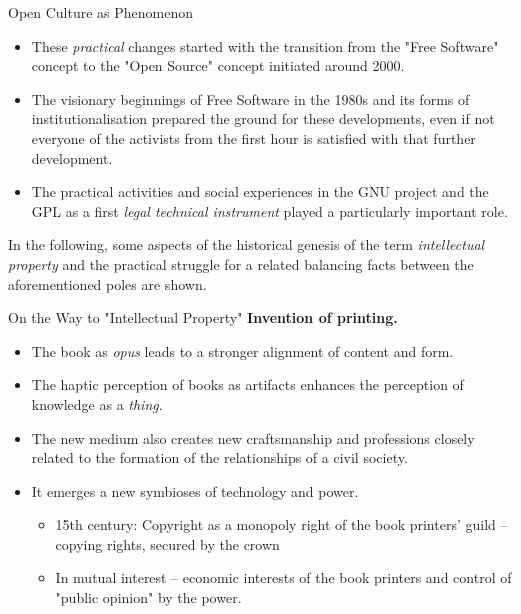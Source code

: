 \documentclass{beamer}
\begin{document}
\begin{frame}{Open Culture as Phenomenon} 
\begin{itemize} 
\item These \emph{practical} changes started with the transition from the
  "Free Software" concept to the "Open Source" concept initiated around 2000.
\item The visionary beginnings of Free Software in the 1980s and its forms of
  institutionalisation prepared the ground for these developments, even if not
  everyone of the activists from the first hour is satisfied with that further
  development.
\item The practical activities and social experiences in the GNU project and
  the GPL as a first \emph{legal technical instrument} played a particularly
  important role.
\end{itemize}
In the following, some aspects of the historical genesis of the term
\emph{intellectual property} and the practical struggle for a related
balancing facts between the aforementioned poles are shown.
\end{frame}

\begin{frame}{On the Way to "Intellectual Property"}
\textbf{Invention of printing.}
\begin{itemize} 
\item The book as \emph{opus} leads to a stronger alignment of content and
  form.
\item The haptic perception of books as artifacts enhances the perception of
  knowledge as a \emph{thing}.
\item The new medium also creates new craftsmanship and professions closely
  related to the formation of the relationships of a civil society.
\item It emerges a new symbioses of technology and power.
  \begin{itemize}
  \item 15th century: Copyright as a monopoly right of the book printers'
    guild -- copying rights, secured by the crown
  \item In mutual interest -- economic interests of the book printers and
    control of "public opinion" by the power.
  \end{itemize}
\end{itemize}
\end{frame}
\end{document}

